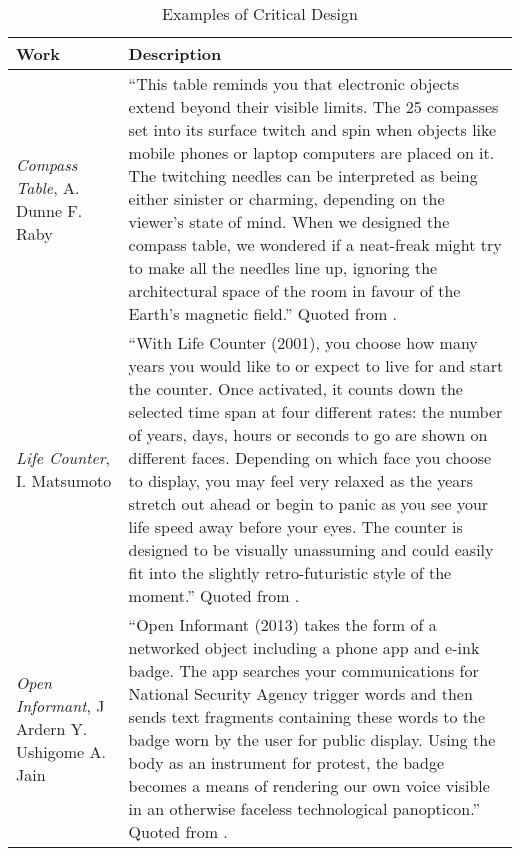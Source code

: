 
\begin{table*}
\centering
\caption{Examples of Critical Design\label{tab:examples}}
\begin{tabular}{|p{3.5cm}|p{13cm}|} 
\hline

Work & Description \\ \hline

\textit{Compass Table}, \newline A. Dunne \newline F. Raby &
``This table reminds you that electronic objects extend beyond their visible limits. The 25 compasses set into its surface twitch and spin when objects like mobile phones or laptop computers are placed on it. The twitching needles can be interpreted as being either sinister or charming, depending on the viewer's state of mind. When we designed the compass table, we wondered if a neat-freak might try to make all the needles line up, ignoring the architectural space of the room in favour of the Earth's magnetic field.'' Quoted from \cite{DuRa01}. \\ \hline

\textit{Life Counter}, \newline I. Matsumoto &
``With Life Counter (2001), you choose how many years you would like to or expect to live for and start the counter. Once activated, it counts down the selected time span at four different rates: the number of years, days, hours or seconds to go are shown on different faces. Depending on which face you choose to display, you may feel very relaxed as the years stretch out ahead or begin to panic as you see your life speed away before your eyes. The counter is designed to be visually unassuming and could easily fit into the slightly retro-futuristic style of the moment.'' Quoted from \cite{DuRa01}. \\ \hline

\textit{Open Informant}, \newline J Ardern \newline Y. Ushigome \newline A. Jain &
``Open Informant (2013) takes the form of a networked object including a phone app and e-ink badge. The app searches your communications for National Security Agency trigger words and then sends text fragments containing these words to the badge worn by the user for public display. Using the body as an instrument for protest, the badge becomes a means of rendering our own voice visible in an otherwise faceless technological panopticon.'' Quoted from \cite{Mal17}. \\ \hline

\end{tabular}
\end{table*}